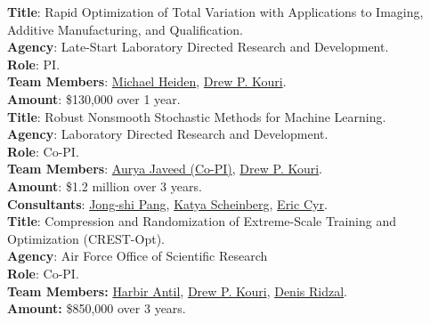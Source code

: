 \documentclass[11pt, a4paper]{article}
\newcommand{\years}[1]{\marginnote{#1}}
\begin{document}
\years{2024} \textbf{Title}: Rapid Optimization of Total Variation with Applications to Imaging, Additive Manufacturing, and Qualification. \\
\textbf{Agency}: Late-Start Laboratory Directed Research and Development.\\
\textbf{Role}: PI. \\
\textbf{Team Members}: \href{https://www.sandia.gov/research/publications/search/?sort=date&format=citation&authors%5B0%5D=michael-heiden}{Michael Heiden}, \href{https://cfwebprod.sandia.gov/cfdocs/CompResearch/templates/insert/profile.cfm?dpkouri}{Drew P. Kouri}.\\
\textbf{Amount}: \$130,000 over 1 year.\\
\noindent
\years{2023}\textbf{Title}: Robust Nonsmooth Stochastic Methods for Machine Learning.\\
\textbf{Agency}: Laboratory Directed Research and Development.\\
\textbf{Role}: Co-PI. \\
\textbf{Team Members}: \href{https://rol.sandia.gov/team/}{Aurya Javeed (Co-PI)},
\href{https://cfwebprod.sandia.gov/cfdocs/CompResearch/templates/insert/profile.cfm?dpkouri}{Drew P. Kouri}.\\
\textbf{Amount}: \$1.2 million over 3 years.\\
\textbf{Consultants}: \href{https://viterbi.usc.edu/directory/faculty/Pang/Jong-Shi}{Jong-shi Pang}, \href{https://www.orie.cornell.edu/faculty-directory/katya-scheinberg}{Katya Scheinberg}, \href{https://www.sandia.gov/ccr/staff/eric-christopher-cyr/}{Eric Cyr}.\\
\noindent
\years{2022} \textbf{Title}: Compression and Randomization of Extreme-Scale Training and Optimization (CREST-Opt).\\
\textbf{Agency}: Air Force Office of Scientific Research\\
\textbf{Role}: Co-PI.\\
 \textbf{Team Members:}
\href{https://math.gmu.edu/~hantil/}{Harbir Antil},
\href{https://cfwebprod.sandia.gov/cfdocs/CompResearch/templates/insert/profile.cfm?dpkouri}{Drew P. Kouri},
\href{https://cfwebprod.sandia.gov/cfdocs/CompResearch/templates/insert/profile.cfm?dridzal}{Denis Ridzal}.\\
 \textbf{Amount:} \$850,000 over 3 years.\\
\end{document}

